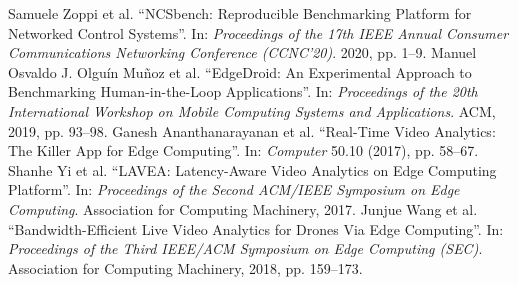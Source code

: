 \documentclass[sigconf,9pt,natbib=false,nonacm=true]{acmart}
\begin{document}
\begin{thebibliography}{99}
  Samuele Zoppi et al. “{NCSbench}: Reproducible Benchmarking Platform for Networked Control Systems”. In: \emph{Proceedings of the {17th} IEEE Annual Consumer Communications Networking Conference (CCNC’20)}. 2020, pp. 1–9.
  Manuel Osvaldo J. Olguín Muñoz et al. “{EdgeDroid: An Experimental Approach to Benchmarking Human-in-the-Loop Applications}”. In: \emph{Proceedings of the 20th International Workshop on Mobile Computing Systems and Applications}. ACM, 2019, pp. 93–98.
  Ganesh Ananthanarayanan et al. “Real-Time Video Analytics: The Killer App for Edge Computing”. In: \emph{Computer} 50.10 (2017), pp. 58–67.
  Shanhe Yi et al. “LAVEA: Latency-Aware Video Analytics on Edge Computing Platform”. In: \emph{Proceedings of the Second ACM/IEEE Symposium on Edge Computing}. Association for Computing Machinery, 2017.
  Junjue Wang et al. “Bandwidth-Efficient Live Video Analytics for Drones Via Edge Computing”. In: \emph{Proceedings of the Third IEEE/ACM Symposium on Edge Computing (SEC)}. Association for Computing Machinery, 2018, pp. 159–173.
\end{thebibliography}
\end{document}
